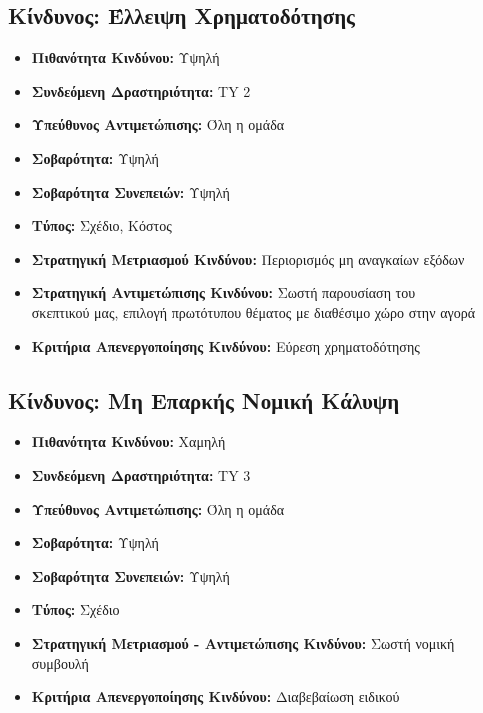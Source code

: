 \documentclass[12pt,a4paper]{article}
\begin{document}
\subsection{Κίνδυνος: Έλλειψη Χρηματοδότησης}
\begin{itemize}
	\item \textbf{Πιθανότητα Κινδύνου:} Υψηλή
	\item \textbf{Συνδεόμενη Δραστηριότητα:} TY 2
	\item \textbf{Υπεύθυνος Αντιμετώπισης:} Όλη η ομάδα
	\item \textbf{Σοβαρότητα:} Υψηλή
	\item \textbf{Σοβαρότητα Συνεπειών:} Υψηλή
	\item \textbf{Τύπος:} Σχέδιο, Κόστος
	\item \textbf{Στρατηγική Μετριασμού Κινδύνου:} Περιορισμός μη αναγκαίων εξόδων
	\item \textbf{Στρατηγική Αντιμετώπισης Κινδύνου:} Σωστή παρουσίαση του \\σκεπτικού μας, επιλογή πρωτότυπου θέματος με διαθέσιμο χώρο στην αγορά
	\item \textbf{Κριτήρια Απενεργοποίησης Κινδύνου:} Εύρεση χρηματοδότησης
\end{itemize}

\subsection{Κίνδυνος: Μη Επαρκής Νομική Κάλυψη}
\begin{itemize}
	\item \textbf{Πιθανότητα Κινδύνου:} Χαμηλή
	\item \textbf{Συνδεόμενη Δραστηριότητα:} TY 3
	\item \textbf{Υπεύθυνος Αντιμετώπισης:} Όλη η ομάδα
	\item \textbf{Σοβαρότητα:} Υψηλή
	\item \textbf{Σοβαρότητα Συνεπειών:} Υψηλή
	\item \textbf{Τύπος:} Σχέδιο
	\item \textbf{Στρατηγική Μετριασμού - Αντιμετώπισης Κινδύνου:} Σωστή νομική συμβουλή
	\item \textbf{Κριτήρια Απενεργοποίησης Κινδύνου:} Διαβεβαίωση ειδικού
\end{itemize}
\end{document}
